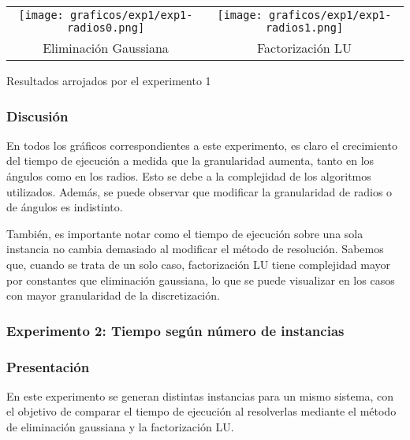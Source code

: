         \vspace{1em}

        \begin{minipage}{\textwidth}
          \begin{center}

            \begin{tabular}{cc}
              \texttt{[image: graficos/exp1/exp1-radios0.png]} & \texttt{[image: graficos/exp1/exp1-radios1.png]} \\
              {\small Eliminación Gaussiana} & {\small Factorización LU} \\
            \end{tabular}

            \vspace{1em}
            {\small Resultados arrojados por el experimento 1}
          \end{center}
        \end{minipage}

      \subsubsection*{Discusión}
        En todos los gráficos correspondientes a este experimento, es claro el crecimiento del tiempo de ejecución a medida que la granularidad aumenta, tanto en los ángulos como en los radios. Esto se debe a la complejidad de los algoritmos utilizados. 
        Además, se puede observar que modificar la granularidad de radios o de ángulos es indistinto.

        También, es importante notar como el tiempo de ejecución sobre una sola instancia no cambia demasiado al modificar el método de resolución. Sabemos que, cuando se trata de un solo caso, factorización LU tiene complejidad mayor por constantes que eliminación gaussiana, lo que se puede visualizar en los casos con mayor granularidad de la discretización.

    \subsubsection{Experimento 2: Tiempo según número de instancias} 

      \subsubsection*{Presentación}
        En este experimento se generan distintas instancias para un mismo sistema, con el objetivo de comparar el tiempo de ejecución al resolverlas mediante el método de eliminación gaussiana y la factorización LU. 
        
